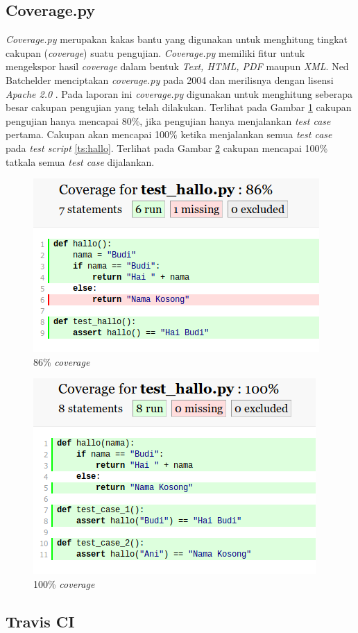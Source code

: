 \subsection{Coverage.py}

\emph{Coverage.py} merupakan kakas bantu yang digunakan untuk
menghitung tingkat cakupan (\emph{coverage}) suatu
pengujian. \emph{Coverage.py} memiliki fitur untuk mengekspor hasil
\emph{coverage} dalam bentuk \emph{Text, HTML, PDF} maupun
\emph{XML}. Ned Batchelder menciptakan \emph{coverage.py} pada 2004
dan merilisnya dengan lisensi \emph{Apache 2.0}
\parencite{coverage-ol}. Pada laporan ini \emph{coverage.py} digunakan
untuk menghitung seberapa besar cakupan pengujian yang telah
dilakukan. Terlihat pada Gambar \ref{fig:cov-1} cakupan pengujian
hanya mencapai 80\%, jika pengujian hanya menjalankan \emph{test case}
pertama. Cakupan akan mencapai 100\% ketika menjalankan semua
\emph{test case} pada \emph{test script} \ref{ts:hallo}.
Terlihat pada Gambar \ref{fig:cov-2} cakupan mencapai 100\% tatkala semua
\emph{test case} dijalankan.

\begin{figure}[H]
  \centering
  \includegraphics[width=.5\linewidth]{img/cov-1}
  \caption{86\% \emph{coverage}}
  \label{fig:cov-1}
\end{figure}

\begin{figure}[H]
  \centering
  \includegraphics[width=.5\linewidth]{img/cov-2}
  \caption{100\% \emph{coverage}}
  \label{fig:cov-2}
\end{figure}


\subsection{Travis CI}

